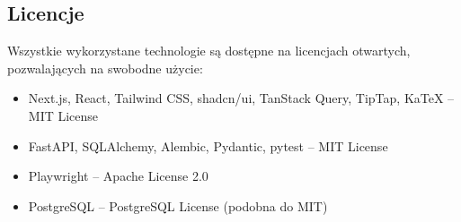 \subsection{Licencje}

Wszystkie wykorzystane technologie są dostępne na licencjach otwartych, pozwalających na swobodne użycie:

\begin{itemize}[leftmargin=*]
    \item Next.js, React, Tailwind CSS, shadcn/ui, TanStack Query, TipTap, KaTeX -- MIT License
    \item FastAPI, SQLAlchemy, Alembic, Pydantic, pytest -- MIT License
    \item Playwright -- Apache License 2.0
    \item PostgreSQL -- PostgreSQL License (podobna do MIT)
\end{itemize}
